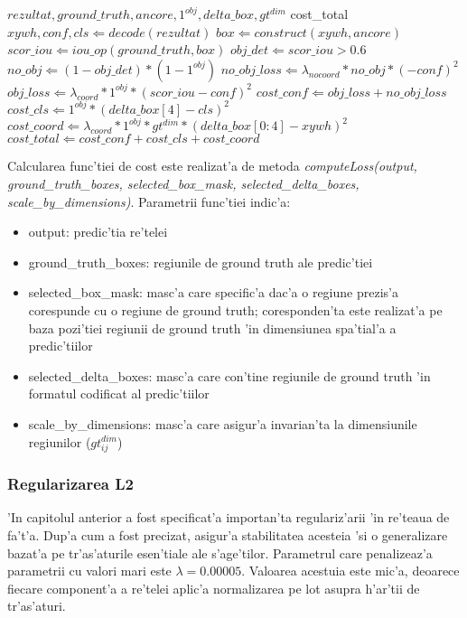 \documentclass[12pt,a4paper,twoside]{report}
\begin{document}
\begin{algorithmic}
\Require $rezultat, ground\_truth, ancore, 1^{obj}, delta\_box, gt^{dim}$
\Ensure cost\_total
\State $xywh, conf, cls \Leftarrow decode(rezultat)$
\State $box \Leftarrow construct(xywh, ancore)$
\State $scor\_iou \Leftarrow iou\_op(ground\_truth, box)$
\State $obj\_det \Leftarrow scor\_iou > 0.6$ 
\State $no\_obj \Leftarrow (1 - obj\_det) * (1 - 1^{obj})$ 
\State $no\_obj\_loss \Leftarrow \lambda_{nocoord} * no\_obj * (- conf) ^ 2$ 
\State $obj\_loss \Leftarrow \lambda_{coord} * 1^{obj} * (scor\_iou - conf) ^ 2$ 
\State $cost\_conf \Leftarrow obj\_loss + no\_obj\_loss$
\State $cost\_cls \Leftarrow 1^{obj} * (delta\_box[4] - cls) ^ 2$
\State $cost\_coord \Leftarrow \lambda_{coord} * 1^{obj} * gt^{dim} * (delta\_box[0:4] - xywh) ^ 2$
\State $cost\_total \Leftarrow cost\_conf + cost\_cls + cost\_coord$
\end{algorithmic}

\leavevmode \newline
Calcularea func'tiei de cost este realizat'a de metoda \textit{computeLoss(output, ground\_truth\_boxes, selected\_box\_mask, selected\_delta\_boxes, scale\_by\_dimensions)}. Parametrii func'tiei indic'a:
\begin{itemize}
\item output: predic'tia re'telei
\item ground\_truth\_boxes: regiunile de ground truth ale predic'tiei
\item selected\_box\_mask: masc'a care specific'a dac'a o regiune prezis'a corespunde cu o regiune de ground truth; coresponden'ta este realizat'a pe baza pozi'tiei regiunii de ground truth 'in dimensiunea spa'tial'a a predic'tiilor
\item selected\_delta\_boxes: masc'a care con'tine regiunile de ground truth 'in formatul codificat al  predic'tiilor 
\item scale\_by\_dimensions: masc'a care asigur'a invarian'ta la dimensiunile regiunilor ($gt_{ij}^{dim}$)
\end{itemize}

\subsubsection{Regularizarea L2}
'In capitolul anterior a fost specificat'a importan'ta regulariz'arii 'in re'teaua de fa't'a. Dup'a cum a fost precizat, asigur'a stabilitatea acesteia 'si o generalizare bazat'a pe tr'as'aturile esen'tiale ale s'age'tilor. Parametrul care penalizeaz'a parametrii cu valori mari este $\lambda = 0.00005$. Valoarea acestuia este mic'a, deoarece fiecare component'a a re'telei aplic'a normalizarea pe lot asupra h'ar'tii de tr'as'aturi. 
\end{document}
